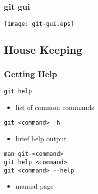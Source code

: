 \documentclass[english]{beamer}
\newcommand{\mysubsection}[2]{%
  \hypertarget{#2}{}%
  \subsection{#1}%
  \label{#2}%
}
\newcommand{\CMD}[1]{%
\texttt{\textcolor{code-blue}{#1}}%
}
\begin{document}
\begin{frame}[fragile]
\frametitle{git gui}

\begin{center}
\texttt{[image: git-gui.eps]}
\end{center}

\end{frame}

\mysubsection{House Keeping}{using:housekeeping}
\begin{frame}
\frametitle{Getting Help}

\CMD{git help}
\begin{itemize}
        \item list of common commands
\end{itemize}

\vspace{.1\textheight}

\CMD{git <command> -h}
\begin{itemize}
        \item brief help output
\end{itemize}

\vspace{.1\textheight}

\CMD{man git-<command>} \\
\CMD{git help <command>} \\
\CMD{git <command> {-}-help} \\
\begin{itemize}
        \item manual page
\end{itemize}

\end{frame}
\end{document}
